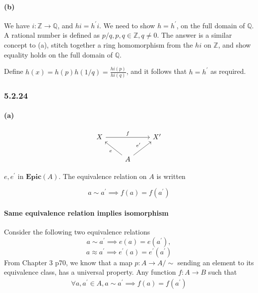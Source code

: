 \documentclass{article}
\begin{document}
\paragraph{(b)}
We have $i: \mathds{Z} \rightarrow \mathds{Q}$, and $hi=h^\prime i$. We need to show $h=h^
\prime$, on the full domain of $\mathds{Q}$.
A rational number is defined as $p/q, p,q \in \mathds{Z}, q \neq 0$. The answer is a similar concept to (a), stitch together a ring homomorphism from the $hi$ on $\mathds{Z}$, and show equality holds on the full domain of $\mathds{Q}$.

Define $h(x) = h(p)h(1/q) = \frac{hi(p)}{hi(q)}$, and it follows that $h=h^\prime$ as required.

\subsubsection*{5.2.24}
\paragraph{(a)}

\begin{equation*}
\begin{tikzcd}
X \arrow{rr}{f} & & X^\prime \\
& \arrow{ul}{e} A \arrow{ur}{e^\prime}
\end{tikzcd}
\end{equation*}

$e, e^\prime$ in $\mathbf{Epic}(A)$. The equivalence relation on $A$ is written

\begin{equation*}
a \sim a^\prime \implies f(a) = f(a^\prime)
\end{equation*}

\paragraph{Same equivalence relation implies isomorphism}

Consider the following two equivalence relations
\begin{equation}
  \label{eqn5224a1}
  a \sim a^\prime \implies e(a) = e(a^\prime),
\end{equation}
\begin{equation}
  \label{eqn5224a2}
  a \approx a^\prime  \implies e^\prime(a) = e^\prime(a^\prime)
\end{equation}
From Chapter 3 p70, we know that a map $p: A \rightarrow A/\sim$ sending an element to its equivalence class, has a universal property. Any function $f: A \rightarrow B$ such that
\begin{align*}
  \forall a, a^\prime \in A, a \sim a^\prime \implies f(a)=f(a^\prime)
\end{align*}
\end{document}
